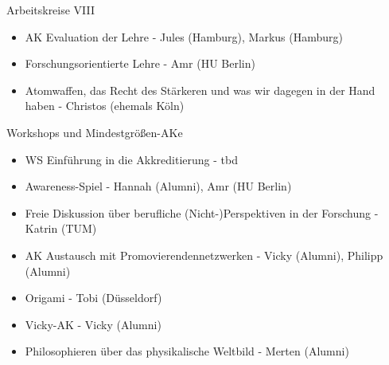 \begin{frame}{Arbeitskreise VIII}
	\begin{itemize}
		\item AK Evaluation der Lehre - Jules (Hamburg), Markus (Hamburg)
		\item Forschungsorientierte Lehre - Amr (HU Berlin)
		\item Atomwaffen, das Recht des Stärkeren und was wir dagegen in der Hand haben - Christos (ehemals Köln)
	\end{itemize}
\end{frame}

\begin{frame}{Workshops und Mindestgrößen-AKe}
	\begin{itemize}
		\item WS Einführung in die Akkreditierung - tbd
		\item Awareness-Spiel - Hannah (Alumni), Amr (HU Berlin)
	\end{itemize}
	\vspace{.5 cm}
	\begin{itemize}
		\item Freie Diskussion über berufliche (Nicht-)Perspektiven in der Forschung - Katrin (TUM)
		\item AK Austausch mit Promovierendennetzwerken - Vicky (Alumni), Philipp (Alumni)
		\item Origami - Tobi (Düsseldorf)
		\item Vicky-AK - Vicky (Alumni)
		\item Philosophieren über das physikalische Weltbild - Merten (Alumni)
	\end{itemize}
\end{frame}
